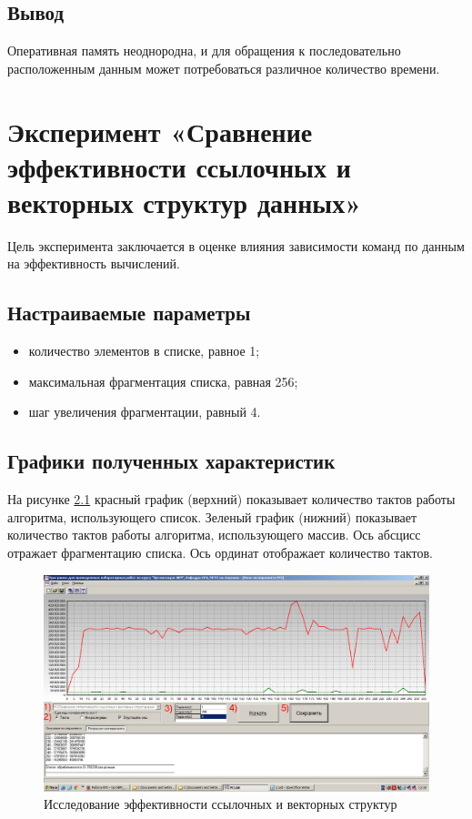 \section{Вывод}

Оперативная память неоднородна, и для обращения к последовательно расположенным данным может потребоваться различное количество времени.

\chapter{Эксперимент «Сравнение эффективности ссылочных и векторных структур данных»}

Цель эксперимента заключается в оценке влияния зависимости команд по данным на эффективность вычислений.

\section{Настраиваемые параметры}

\begin{itemize}
	\item количество элементов в списке, равное 1;
	\item максимальная фрагментация списка, равная 256;
	\item шаг увеличения фрагментации, равный 4.
\end{itemize}

\section{Графики полученных характеристик}

На рисунке \ref{img:struct} красный график (верхний) показывает количество тактов работы алгоритма, использующего список. Зеленый график (нижний) показывает количество тактов работы алгоритма, использующего массив. Ось абсцисс отражает фрагментацию списка. Ось ординат отображает количество
тактов.

\begin{figure}[H]
	\begin{center}
		\includegraphics[scale=0.3]{img/struct.jpg}
	\end{center}
	\captionsetup{justification=centering}
	\caption{Исследование эффективности ссылочных и векторных структур}
	\label{img:struct}
\end{figure}

